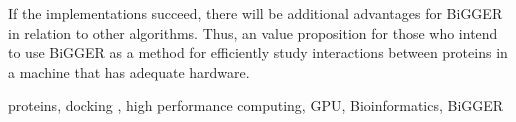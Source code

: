 If the implementations succeed, there will be additional advantages for BiGGER in relation to other algorithms. Thus, an value proposition for those who intend to use BiGGER as a method for efficiently study interactions between proteins in a machine that has adequate hardware.
%
%
\begin{keywords}
proteins, docking , high performance computing, GPU, Bioinformatics, BiGGER
\end{keywords} 
